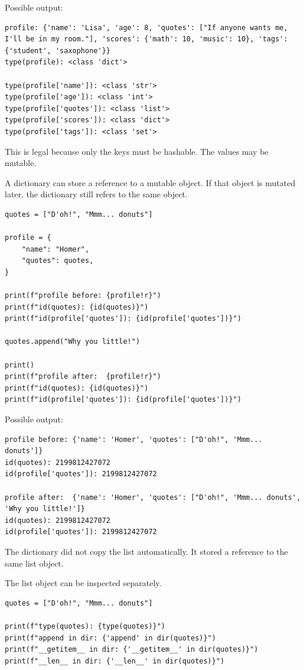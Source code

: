 Possible output:

\begin{verbatim}
profile: {'name': 'Lisa', 'age': 8, 'quotes': ["If anyone wants me, I'll be in my room."], 'scores': {'math': 10, 'music': 10}, 'tags': {'student', 'saxophone'}}
type(profile): <class 'dict'>

type(profile['name']): <class 'str'>
type(profile['age']): <class 'int'>
type(profile['quotes']): <class 'list'>
type(profile['scores']): <class 'dict'>
type(profile['tags']): <class 'set'>
\end{verbatim}

This is legal because only the keys must be hashable. The values may be mutable.

A dictionary can store a reference to a mutable object. If that object is mutated later, the dictionary still refers to the same object.

\begin{verbatim}
quotes = ["D'oh!", "Mmm... donuts"]

profile = {
    "name": "Homer",
    "quotes": quotes,
}

print(f"profile before: {profile!r}")
print(f"id(quotes): {id(quotes)}")
print(f"id(profile['quotes']): {id(profile['quotes'])}")

quotes.append("Why you little!")

print()
print(f"profile after:  {profile!r}")
print(f"id(quotes): {id(quotes)}")
print(f"id(profile['quotes']): {id(profile['quotes'])}")
\end{verbatim}

Possible output:

\begin{verbatim}
profile before: {'name': 'Homer', 'quotes': ["D'oh!", 'Mmm... donuts']}
id(quotes): 2199812427072
id(profile['quotes']): 2199812427072

profile after:  {'name': 'Homer', 'quotes': ["D'oh!", 'Mmm... donuts', 'Why you little!']}
id(quotes): 2199812427072
id(profile['quotes']): 2199812427072
\end{verbatim}

The dictionary did not copy the list automatically. It stored a reference to the same list object.

The list object can be inspected separately.

\begin{verbatim}
quotes = ["D'oh!", "Mmm... donuts"]

print(f"type(quotes): {type(quotes)}")
print(f"append in dir: {'append' in dir(quotes)}")
print(f"__getitem__ in dir: {'__getitem__' in dir(quotes)}")
print(f"__len__ in dir: {'__len__' in dir(quotes)}")
\end{verbatim}

